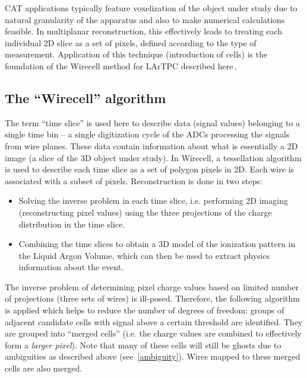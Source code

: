 \documentclass[a4paper]{jpconf}
\begin{document}
CAT applications typically feature voxelization of the object under study due to natural granularity of the apparatus and also to make numerical
calculations feasible. In multiplanar reconstruction, this effectively leads to treating each individual 2D slice as a set of pixels, defined according
to the type of measurement. Application of this technique (introduction of cells) is the foundation of the Wirecell method
for LArTPC
described here\,\cite{wirecell}.


\subsection{The ``Wirecell'' algorithm}
The term ``time slice'' is used here to describe data (signal values)  belonging to a single time bin -- a single digitization cycle of the ADCs processing
the signals from wire planes. These data contain information about what is essentially a 2D image (a slice of the 3D object under study).
In Wirecell, a tessellation algorithm is used to describe each time slice as a set of polygon pixels in 2D.  Each wire is associated with a subset of pixels.
Reconstruction is done in two steps: 
\begin{itemize}
\item Solving the inverse problem in each time slice, i.e. performing 2D imaging (reconstructing pixel values) using the three projections of the
charge distribution in the time slice.
\item Combining the time slices to obtain a 3D model of the ionization pattern in the Liquid Argon Volume, which can then be used to extract
physics information about the event.
\end{itemize}

\noindent
The inverse problem of determining pixel charge values based on limited number of projections (three sets of wires) is  ill-posed.
Therefore, the following algorithm is applied which helps to reduce the number of degrees
of freedom: groups of adjacent candidate cells with signal above a certain
 threshold are identified. They are grouped into ``merged cells'' (i.e. the charge values are combined to effectively form a
 \textit{larger pixel}).
Note that many of these cells will still be ghosts due to ambiguities as described above  (see~\ref{ambiguity}).
Wires mapped to these merged cells are also merged.
\end{document}
